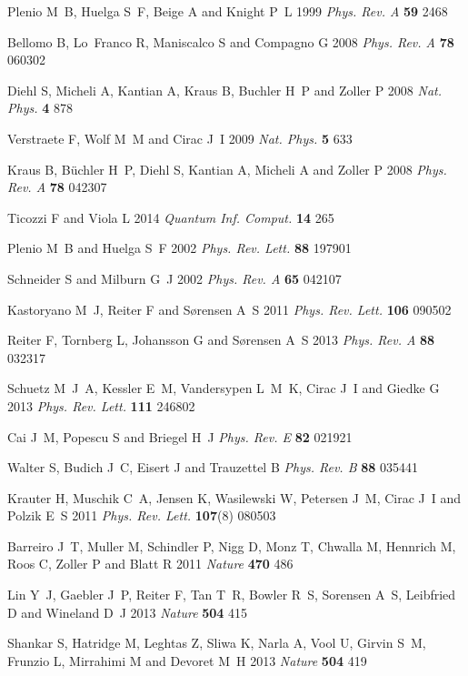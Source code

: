 \documentclass[12pt]{iopart}
\begin{document}
\begin{thebibliography}{10}
Plenio M~B, Huelga S~F, Beige A and Knight P~L 1999 {\em Phys. Rev. A\/} {\bf
  59} 2468

Bellomo B, Lo~Franco R, Maniscalco S and Compagno G 2008 {\em Phys. Rev. A\/}
  {\bf 78} 060302

Diehl S, Micheli A, Kantian A, Kraus B, Buchler H~P and Zoller P 2008 {\em Nat.
  Phys.\/} {\bf 4} 878

Verstraete F, Wolf M~M and Cirac J~I 2009 {\em Nat. Phys.\/} {\bf 5} 633

Kraus B, B\"uchler H~P, Diehl S, Kantian A, Micheli A and Zoller P 2008 {\em
  Phys. Rev. A\/} {\bf 78} 042307

Ticozzi F and Viola L 2014 {\em Quantum Inf. Comput.\/} {\bf 14} 265

Plenio M~B and Huelga S~F 2002 {\em Phys. Rev. Lett.\/} {\bf 88} 197901

Schneider S and Milburn G~J 2002 {\em Phys. Rev. A\/} {\bf 65} 042107

Kastoryano M~J, Reiter F and S\o{}rensen A~S 2011 {\em Phys. Rev. Lett.\/} {\bf
  106} 090502

Reiter F, Tornberg L, Johansson G and S\o{}rensen A~S 2013 {\em Phys. Rev. A\/}
  {\bf 88} 032317

Schuetz M~J~A, Kessler E~M, Vandersypen L~M~K, Cirac J~I and Giedke G 2013 {\em
  Phys. Rev. Lett.\/} {\bf 111} 246802

Cai J~M, Popescu S and Briegel H~J {\em Phys. Rev. E\/} {\bf 82} 021921

Walter S, Budich J~C, Eisert J and Trauzettel B {\em Phys. Rev. B\/} {\bf 88}
  035441

Krauter H, Muschik C~A, Jensen K, Wasilewski W, Petersen J~M, Cirac J~I and
  Polzik E~S 2011 {\em Phys. Rev. Lett.\/} {\bf 107}(8) 080503

Barreiro J~T, Muller M, Schindler P, Nigg D, Monz T, Chwalla M, Hennrich M,
  Roos C, Zoller P and Blatt R 2011 {\em Nature\/} {\bf 470} 486

Lin Y~J, Gaebler J~P, Reiter F, Tan T~R, Bowler R~S, Sorensen A~S, Leibfried D
  and Wineland D~J 2013 {\em Nature\/} {\bf 504} 415

Shankar S, Hatridge M, Leghtas Z, Sliwa K, Narla A, Vool U, Girvin S~M, Frunzio
  L, Mirrahimi M and Devoret M~H 2013 {\em Nature\/} {\bf 504} 419


\end{thebibliography}
\end{document}
